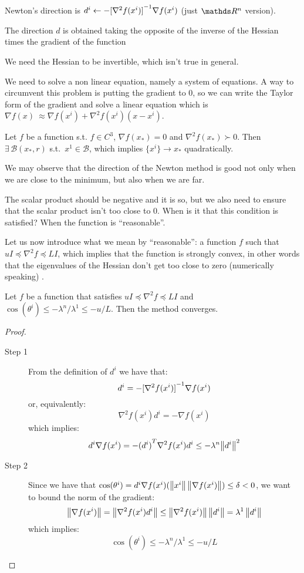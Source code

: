 \documentclass[ComputationalMathematics.tex]{subfiles}
\begin{document}

\begin{corollary}
  Newton's direction is $d^i \gets - {[\nabla^2 f(x^i)]}^{-1} \nabla f(x^i)$  (just $\R^n$ version).
\end{corollary}
The direction $d$ is obtained taking the opposite of the inverse of the Hessian times the gradient of the function

\begin{obs}
  We need the Hessian to be invertible, which isn't true in general.
\end{obs}

We need to solve a non linear equation, namely a system of equations. A way to circumvent this problem is putting the gradient to $0$, so we can write the Taylor form of the gradient and solve a linear equation which is $\nabla f(x) ~ \approx \nabla f(x^i) + \nabla^2 f(x^i)(x - x^i)$.

\begin{theorem}
Let $f$ be a function s.t. $f \in C^3$, $\nabla f(x_*) = 0$ and $\nabla^2 f(x_*) \succ 0$. Then $\exists \, \mathcal{B}(x_*,r)$ s.t.~$x^1 \in \mathcal{B}$, which implies $\{x^i\} \to x_*$ quadratically.
\end{theorem}

We may observe that the direction of the Newton method is good not only when we are close to the minimum, but also when we are far.

The scalar product should be negative and it is so, but we also need to ensure that the scalar product isn't too close to $0$. When is it that this condition is satisfied? When the function is ``reasonable''.

Let us now introduce what we mean by ``reasonable'': a function $f$ such that $u I \preceq \nabla^2 f \preceq L I$, which implies that the function is strongly convex, in other words that the eigenvalues of the Hessian don't get too close to zero (numerically speaking)
.
\begin{theorem}
Let $f$ be a function that satisfies $u I \preceq \nabla^2 f \preceq L I$ and $\cos(\theta^i) \leq - \lambda^n / \lambda^1 \leq - u / L$. Then the method converges.
\end{theorem}

\begin{proof}~%
  \begin{description}
    \item[{\sc Step 1}]
From the definition of $d^i$ we have that:
\[
  d^i = - {[\nabla^2 f(x^i)]}^{-1} \nabla f(x^i)
\]
or, equivalently:
\[
  \nabla^2 f(x^i) d^i = - \nabla f(x^i)
\]
which implies:
\[
  d^i \nabla f(x^i) = - {(d^i)}^{T} \nabla^2 f(x^i) d^i \leq - \lambda^n {\left\lVert d^i\right\rVert}^2
\]
  \item[{\sc Step 2}]
    Since we have that $\cos(\theta^i) = d^i \nabla f(x^i) (\left\lVert x^i\right\rVert \left\lVert\nabla f(x^i)\right\rVert) \leq \delta < 0$, we want to bound the norm of the gradient:
  \[
    \left\lVert\nabla f(x^i)\right\rVert = \left\lVert\nabla^2 f(x^i) d^i\right\rVert \leq \left\lVert\nabla^2 f(x^i)\right\rVert \left\lVert d^i\right\rVert = \lambda^1 \left\lVert d^i\right\rVert
  \]
      which implies:
  \[
      \cos(\theta^i) \leq - \lambda^n / \lambda^1 \leq - u / L
  \]
\end{description}
\end{proof}
\end{document}
